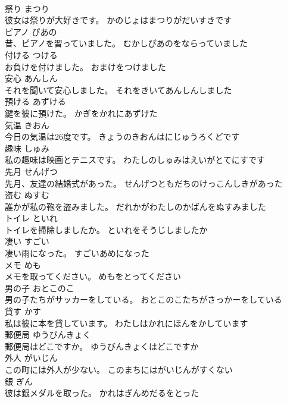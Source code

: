 \documentclass[8pt]{extreport}
\begin{document}
\begin{CJK}{UTF8}{min}
\\	祭り	まつり	
\\	彼女は祭りが大好きです。	かのじょはまつりがだいすきです	
\\	ピアノ	ぴあの	
\\	昔、ピアノを習っていました。	むかしぴあのをならっていました	
\\	付ける	つける	
\\	お負けを付けました。	おまけをつけました	
\\	安心	あんしん	
\\	それを聞いて安心しました。	それをきいてあんしんしました	
\\	預ける	あずける	
\\	鍵を彼に預けた。	かぎをかれにあずけた	
\\	気温	きおん	
\\	今日の気温は26度です。	きょうのきおんはにじゅうろくどです	
\\	趣味	しゅみ	
\\	私の趣味は映画とテニスです。	わたしのしゅみはえいがとてにすです	
\\	先月	せんげつ	
\\	先月、友達の結婚式があった。	せんげつともだちのけっこんしきがあった	
\\	盗む	ぬすむ	
\\	誰かが私の鞄を盗みました。	だれかがわたしのかばんをぬすみました	
\\	トイレ	といれ	
\\	トイレを掃除しましたか。	といれをそうじしましたか	
\\	凄い	すごい	
\\	凄い雨になった。	すごいあめになった	
\\	メモ	めも	
\\	メモを取ってください。	めもをとってください	
\\	男の子	おとこのこ	
\\	男の子たちがサッカーをしている。	おとこのこたちがさっかーをしている	
\\	貸す	かす	
\\	私は彼に本を貸しています。	わたしはかれにほんをかしています	
\\	郵便局	ゆうびんきょく	
\\	郵便局はどこですか。	ゆうびんきょくはどこですか	
\\	外人	がいじん	
\\	この町には外人が少ない。	このまちにはがいじんがすくない	
\\	銀	ぎん	
\\	彼は銀メダルを取った。	かれはぎんめだるをとった	

\end{CJK}
\end{document}
